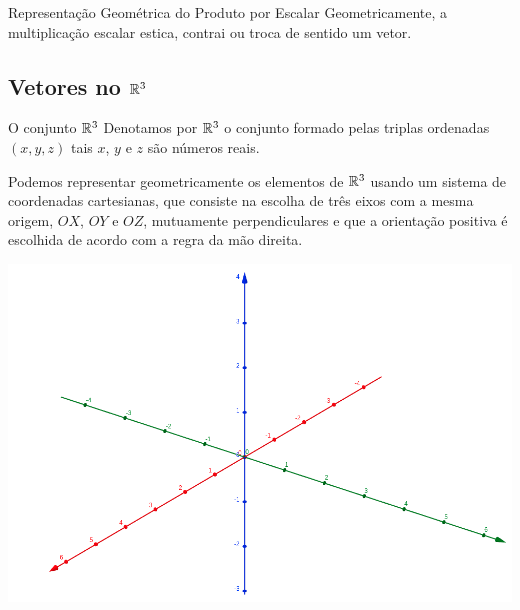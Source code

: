 \begin{frame}[label=vetores]{Representação Geométrica do Produto por Escalar}
Geometricamente, a {\color{blue}multiplicação escalar} estica, contrai ou troca de sentido um vetor.


	\begin{center}
	\end{center}

\end{frame}

\subsection*{Vetores no $\mathbb{R}^3$}
\begin{frame}[label=vetores]{O conjunto  $\mathbb{R}^3$}
Denotamos por   $\mathbb{R}^3$ o conjunto formado pelas {\color{blue}triplas ordenadas} $(x,y,z)$ tais $x$, $y$ e $z$ são números reais.
\medskip

Podemos representar geometricamente os elementos de $\mathbb{R}^3$ usando um {\color{blue}sistema de coordenadas cartesianas}, que consiste na escolha de três  eixos com a mesma origem, $OX$, $OY$ e $OZ$, mutuamente perpendiculares e que a orientação positiva é escolhida de acordo com a {\color{blue} regra da mão direita}.

\begin{center}
\includegraphics[scale=0.2]{figuras/eixos3d2.png}
\end{center}
\end{frame}



